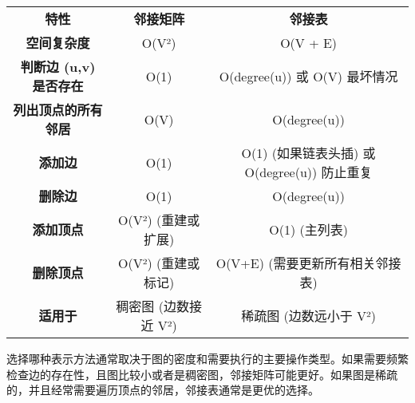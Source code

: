 \begin{table}[h]
	\centering
	\begin{tabular}{|c|c|c|}
		\hline
		 &  &  \\
		\hline
		\textbf{特性} & \textbf{邻接矩阵} & \textbf{邻接表} \\
		\hline
		\textbf{空间复杂度} & O(V²) & O(V + E) \\
		\hline
		\textbf{判断边 (u,v) 是否存在} & O(1) & O(degree(u)) 或 O(V) 最坏情况 \\
		\hline
		\textbf{列出顶点的所有邻居} & O(V) & O(degree(u)) \\
		\hline
		\textbf{添加边} & O(1) & O(1) (如果链表头插) 或 O(degree(u)) 防止重复 \\
		\hline
		\textbf{删除边} & O(1) & O(degree(u)) \\
		\hline
		\textbf{添加顶点} & O(V²) (重建或扩展) & O(1) (主列表) \\
		\hline
		\textbf{删除顶点} & O(V²) (重建或标记) & O(V+E) (需要更新所有相关邻接表) \\
		\hline
		\textbf{适用于} & 稠密图 (边数接近 V²) & 稀疏图 (边数远小于 V²) \\
		\hline
	\end{tabular}
\end{table}
选择哪种表示方法通常取决于图的密度和需要执行的主要操作类型。如果需要频繁检查边的存在性，且图比较小或者是稠密图，邻接矩阵可能更好。如果图是稀疏的，并且经常需要遍历顶点的邻居，邻接表通常是更优的选择。
